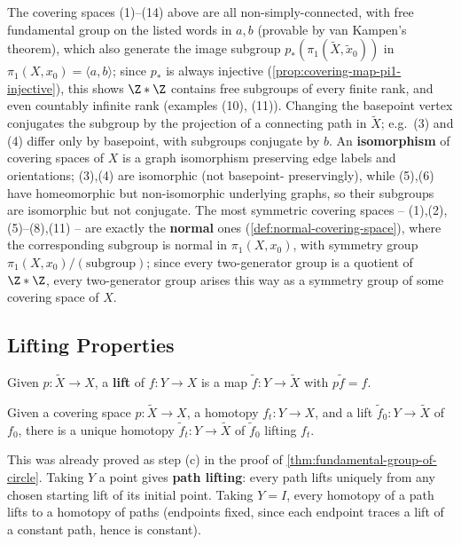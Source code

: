 The covering spaces (1)--(14) above are all non-simply-connected, with free
fundamental group on the listed words in $a,b$ (provable by van Kampen's theorem),
which also generate the image subgroup $p_*(\pi_1(\tilde X,\tilde x_0))$ in
$\pi_1(X,x_0)=\langle a,b\rangle$; since $p_*$ is always injective
(\cref{prop:covering-map-pi1-injective}), this shows $\Z*\Z$ contains free subgroups of
every finite rank, and even countably infinite rank (examples (10), (11)). Changing
the basepoint vertex conjugates the subgroup by the projection of a connecting path
in $\tilde X$; e.g.\ (3) and (4) differ only by basepoint, with subgroups conjugate by
$b$. An \textbf{isomorphism} of covering spaces of $X$ is a graph isomorphism
preserving edge labels and orientations; (3),(4) are isomorphic (not basepoint-
preservingly), while (5),(6) have homeomorphic but non-isomorphic underlying
graphs, so their subgroups are isomorphic but not conjugate. The most symmetric
covering spaces -- (1),(2),(5)--(8),(11) -- are exactly the \textbf{normal} ones
(\cref{def:normal-covering-space}), where the corresponding subgroup is normal in
$\pi_1(X,x_0)$, with symmetry group $\pi_1(X,x_0)/(\text{subgroup})$; since every
two-generator group is a quotient of $\Z*\Z$, every two-generator group arises this
way as a symmetry group of some covering space of $X$.

\subsection*{Lifting Properties}

\begin{definition}
\label{def:lift-of-a-map}
Given $p : \tilde X \to X$, a \textbf{lift} of $f : Y \to X$ is a map $\tilde f : Y \to \tilde X$ with
$p\tilde f = f$.
\end{definition}

\begin{proposition}
\label{prop:covering-homotopy-property}
Given a covering space $p : \tilde X \to X$, a homotopy $f_t : Y \to X$, and a lift
$\tilde f_0 : Y \to \tilde X$ of $f_0$, there is a unique homotopy $\tilde f_t : Y \to \tilde X$ of
$\tilde f_0$ lifting $f_t$.
\end{proposition}

This was already proved as step (c) in the proof of
\cref{thm:fundamental-group-of-circle}. Taking $Y$ a point gives \textbf{path lifting}: every
path lifts uniquely from any chosen starting lift of its initial point. Taking $Y=I$,
every homotopy of a path lifts to a homotopy of paths (endpoints fixed, since each
endpoint traces a lift of a constant path, hence is constant).

